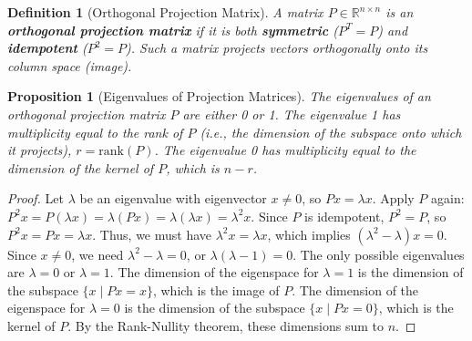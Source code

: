 \documentclass[11pt, a4paper]{article}
\theoremstyle{mydefinitionstyle}
\newtheorem{definition}{Definition}[section]
\theoremstyle{mytheoremstyle}
\newtheorem{proposition}{Proposition}[section]
\newcommand{\R}{\mathbb{R}}
\newcommand{\rank}{\text{rank}}
\begin{document}
\begin{definition}[Orthogonal Projection Matrix] \label{def:orth_proj}
    A matrix $P \in \R^{n \times n}$ is an \textbf{orthogonal projection matrix} if it is both \textbf{symmetric} ($P^T = P$) and \textbf{idempotent} ($P^2 = P$). Such a matrix projects vectors orthogonally onto its column space (image).
\end{definition}

\begin{proposition}[Eigenvalues of Projection Matrices] \label{prop:eigen_proj}
    The eigenvalues of an orthogonal projection matrix $P$ are either 0 or 1. The eigenvalue 1 has multiplicity equal to the rank of $P$ (i.e., the dimension of the subspace onto which it projects), $r = \rank(P)$. The eigenvalue 0 has multiplicity equal to the dimension of the kernel of $P$, which is $n-r$.
\end{proposition}
\begin{proof}
    Let $\lambda$ be an eigenvalue with eigenvector $x \neq 0$, so $Px = \lambda x$.
    Apply $P$ again: $P^2 x = P(\lambda x) = \lambda (Px) = \lambda (\lambda x) = \lambda^2 x$.
    Since $P$ is idempotent, $P^2 = P$, so $P^2 x = Px = \lambda x$.
    Thus, we must have $\lambda^2 x = \lambda x$, which implies $(\lambda^2 - \lambda)x = 0$. Since $x \neq 0$, we need $\lambda^2 - \lambda = 0$, or $\lambda(\lambda - 1) = 0$. The only possible eigenvalues are $\lambda=0$ or $\lambda=1$.
    The dimension of the eigenspace for $\lambda=1$ is the dimension of the subspace $\{x \mid Px=x\}$, which is the image of $P$. The dimension of the eigenspace for $\lambda=0$ is the dimension of the subspace $\{x \mid Px=0\}$, which is the kernel of $P$. By the Rank-Nullity theorem, these dimensions sum to $n$.
\end{proof}
\end{document}
